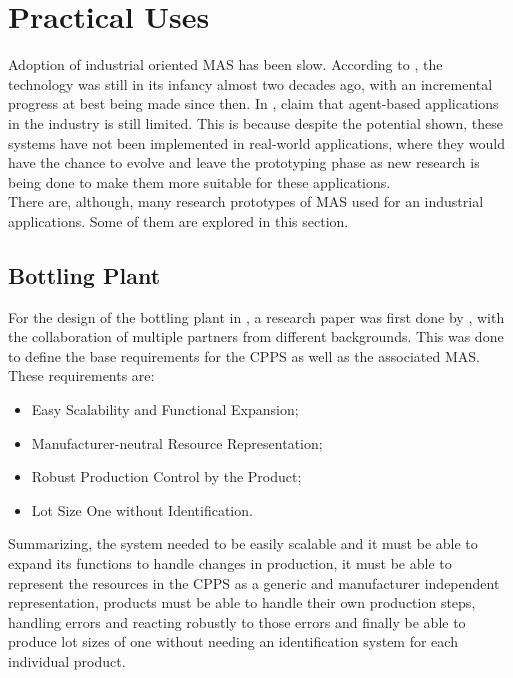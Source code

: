 \section{Practical Uses}
\label{sec:practical_uses}

Adoption of industrial oriented \acrshort{MAS} has been slow. According to \citeauthor{karnouskos02} \cite{karnouskos02}, the technology was still in its infancy almost two decades ago, with an incremental progress at best being made since then. In \cite{Karnouskos2019}, \citeauthor{Karnouskos2019} claim that agent-based applications in the industry is still limited. This is because despite the potential shown, these systems have not been implemented in real-world applications, where they would have the chance to evolve and leave the prototyping phase as new research is being done to make them more suitable for these applications.\\

There are, although, many research prototypes of \acrshort{MAS} used for an industrial applications. Some of them are explored in this section.

\subsection{Bottling Plant}
\label{subsec:bottling_plant}

For the design of the bottling plant in \cite{bottling_plant_part2}, a research paper \cite{bottling_plant_part1} was first done by \citeauthor{bottling_plant_part1}, with the collaboration of multiple partners from different backgrounds. This was done to define the base requirements for the \acrshort{CPPS} as well as the associated \acrshort{MAS}. These requirements are:

\begin{itemize}
	\item Easy Scalability and Functional Expansion;
	\item Manufacturer-neutral Resource Representation;
	\item Robust Production Control by the Product;
	\item Lot Size One without Identification.
\end{itemize}

Summarizing, the system needed to be easily scalable and it must be able to expand its functions to handle changes in production, it must be able to represent the resources in the \acrshort{CPPS} as a generic and manufacturer independent representation, products must be able to handle their own production steps, handling errors and reacting robustly to those errors and finally be able to produce lot sizes of one without needing an identification system for each individual product.\\

